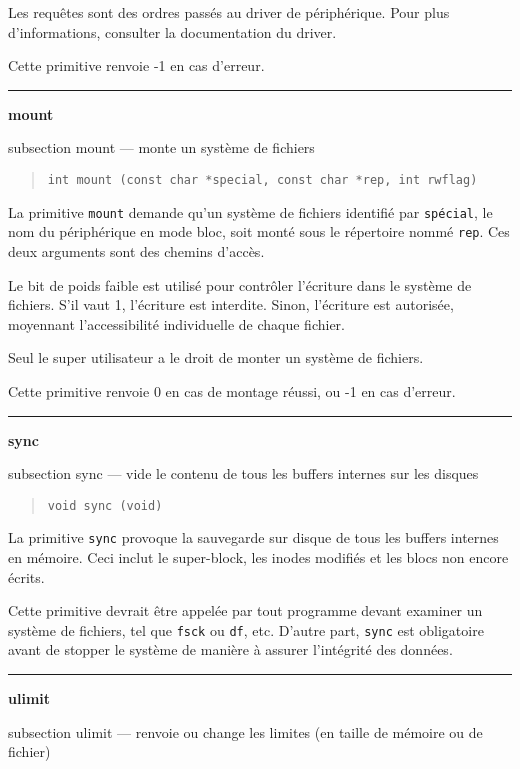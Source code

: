 \documentclass [twoside] {report}
\newcommand {\primitive} [1]
    {
	{\large \bf #1}
	\addcontentsline {toc} {subsection} {#1}
    }
\newcommand {\separation}
    {
	\vspace {7mm}
	\nopagebreak
	\hrule
    }
\begin{document}
Les requêtes sont des ordres passés au driver de
périphérique. Pour plus d'informations, consulter
la documentation du driver.

Cette primitive renvoie -1 en cas d'erreur.




\separation
\primitive {mount} --- monte un système de fichiers

\begin {quote}
\begin {verbatim}
int mount (const char *special, const char *rep, int rwflag)
\end{verbatim}
\end {quote}

La primitive {\tt mount} demande qu'un système de
fichiers identifié par {\tt spécial}, le nom du périphérique en
mode bloc, soit monté sous le répertoire nommé
{\tt rep}. Ces deux arguments sont des chemins
d'accès.

Le bit de poids faible est utilisé pour contrôler
l'écriture dans le système de fichiers. S'il vaut
1, l'écriture est interdite. Sinon, l'écriture est
autorisée, moyennant l'accessibilité individuelle
de chaque fichier.

Seul le super utilisateur a le droit de monter un
système de fichiers.

Cette primitive renvoie 0 en cas de montage
réussi, ou -1 en cas d'erreur.




\separation
\primitive {sync} --- vide le contenu de tous les buffers internes sur les disques

\begin {quote}
\begin {verbatim}
void sync (void)
\end{verbatim}
\end {quote}

La primitive {\tt sync} provoque la sauvegarde sur
disque de tous les buffers internes en mémoire.
Ceci inclut le super-block, les inodes modifiés et
les blocs non encore écrits.

Cette primitive devrait être appelée par tout
programme devant examiner un système de fichiers,
tel que {\tt fsck} ou {\tt df}, etc. D'autre part,
{\tt sync} est obligatoire avant de stopper le
système de manière à assurer l'intégrité des
données.




\separation
\primitive {ulimit} --- renvoie ou change les limites (en taille de mémoire ou de fichier)
\end{document}
